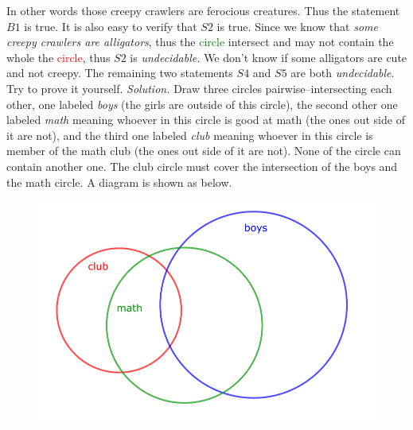 \begin{multicols}{2}
	In other words those creepy crawlers are ferocious creatures. Thus the statement $B1$ is true.
	\vskip 0.1cm
	It is also easy to verify that $S2$ is true.
	\vskip 0.1cm
	Since we know that \textit{some creepy crawlers are alligators}, thus the \textcolor{green}{circle} intersect
	and may not contain the whole the \textcolor{red}{circle}, thus $S2$ is \textit{undecidable.}
	We don't know if some alligators are cute and not creepy.
	\vskip 0.1cm
	The remaining two statements $S4$ and $S5$ are both \textit{undecidable}. Try to prove it yourself.
	\vskip 0.1cm
	\vskip 0.1cm
	\textit{Solution.}
	Draw three circles pairwise--intersecting each other, one labeled \textit{boys} (the girls are outside of this circle),
	the second other one labeled \textit{math} meaning whoever in this circle is good at math (the ones out side of it are not),
	and the third one labeled \textit{club} meaning whoever in this circle is member of the math club (the ones out side of it are not).
	None of the circle can contain another one. The club circle must cover the intersection of the boys and the math circle.
	A diagram is shown as below.
	\begin{figure}[H]
		\centering
		\captionsetup{labelformat= empty, justification=centering}
		\includegraphics[width= 1\linewidth]{pi-2023-01-04.pdf}

\end{figure}
\end{multicols}
